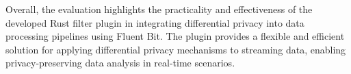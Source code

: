 Overall, the evaluation highlights the practicality and effectiveness of the developed Rust filter plugin in integrating differential privacy into data processing pipelines using Fluent Bit. The plugin provides a flexible and efficient solution for applying differential privacy mechanisms to streaming data, enabling privacy-preserving data analysis in real-time scenarios.